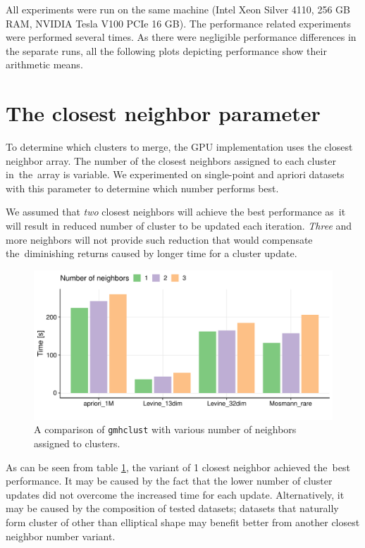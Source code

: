 All experiments were run on the same machine (Intel Xeon Silver 4110, 256 GB RAM, NVIDIA Tesla V100 PCIe 16 GB). The performance related experiments were performed several times. As there were negligible performance differences in the separate runs, all the following plots depicting performance show their arithmetic means. 

\section{The closest neighbor parameter}

To determine which clusters to merge, the GPU implementation uses the closest neighbor array. The number of the closest neighbors assigned to each cluster in~the~array is variable. We experimented on single-point and apriori datasets with this parameter to determine which number performs best. 

We assumed that \emph{two} closest neighbors will achieve the best performance as~it will result in reduced number of cluster to be updated each iteration. \emph{Three} and more neighbors will not provide such reduction that would compensate the~diminishing returns caused by longer time for a cluster update.

\begin{figure}\centering
	\includegraphics[width=\linewidth]{img/neighbor_compare}
	\caption{A comparison of \texttt{gmhclust} with various number of neighbors assigned to clusters.}
	\label{fig04:neigh}
\end{figure}

As can be seen from table \ref{fig04:neigh}, the variant of 1 closest neighbor achieved the~best performance. It may be caused by the fact that the lower number of cluster updates did not overcome the increased time for each update. Alternatively, it may be caused by the composition of tested datasets; datasets that naturally form cluster of other than elliptical shape may benefit better from another closest neighbor number variant.

